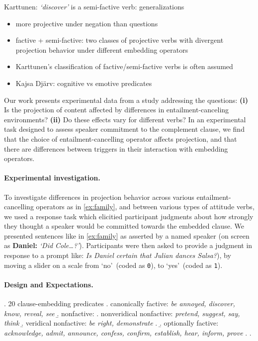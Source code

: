 \documentclass[12pt, a4paper]{scrartcl}
\begin{document}
	Karttunen: \emph{\lq discover\rq} is a semi-factive verb: generalizations 
	\begin{itemize}
		\item more projective under negation than questions
		\item factive + semi-factive: two classes of projective verbs with divergent projection behavior under different embedding operators
		\item Karttunen's classification of factive/semi-factive verbs is often assumed
		\item Kajsa Djärv: cognitive vs emotive predicates
	\end{itemize}

	Our work presents experimental data from a study addressing the questions: \textbf{(i)} Is the projection of content affected by differences in entailment-canceling environments? \textbf{(ii)} Do these effects vary for different verbs? In an experimental task designed to assess speaker commitment to the complement clause, we find that the choice of entailment-cancelling operator affects projection, and that there are differences between triggers in their interaction with embedding operators. 


\paragraph{Experimental investigation.} %
	To investigate differences in projection behavior across various entailment-cancelling operators as in \ref{ex:family}, and between various types of attitude verbs, we used a response task which elicitied participant judgments about how strongly they thought a speaker would be committed towards the embedded clause. We presented sentences like in \ref{ex:family} as asserted by a named speaker (on screen as \textbf{Daniel:} \emph{\lq Did Cole\dots?\rq}). Participants were then asked to provide a judgment in response to a prompt like: \emph{Is Daniel certain that Julian dances Salsa?}), by moving a slider on a scale from \lq no\rq\ (coded as \texttt{0}), to \lq yes\rq\ (coded as \texttt{1}). 


\paragraph{Design and Expectations.} %
	\ex. 20 clause-embedding predicates 
		\a. canonically factive: {\em be annoyed, discover, know, reveal, see}
		\b. nonfactive:
			\a. nonveridical nonfactive: {\em pretend, suggest, say, think}
			\b. veridical nonfactive: {\em be right, demonstrate}
			\z.
		\b. optionally factive: {\em acknowledge, admit, announce, confess, confirm, establish, hear, inform, prove}
		\z.
	\z.
\end{document}

